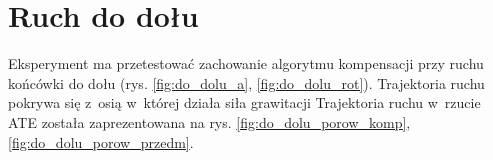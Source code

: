 
\section{Ruch do dołu}

Eksperyment ma przetestować zachowanie algorytmu kompensacji przy ruchu końcówki do dołu (rys. \ref{fig:do_dolu_a}, \ref{fig:do_dolu_rot}). Trajektoria ruchu pokrywa się z~osią w~której działa siła grawitacji Trajektoria ruchu w~rzucie ATE została zaprezentowana na rys. \ref{fig:do_dolu_porow_komp}, \ref{fig:do_dolu_porow_przedm}.

